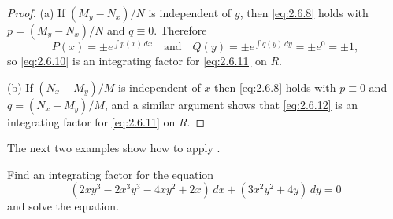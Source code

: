 \medskip

\begin{proof}
(a)
If $(M_y-N_x)/N$ is independent of $y$, then \eqref{eq:2.6.8}
 holds with $p=(M_y-N_x)/N$ and $q\equiv0$. Therefore
 \[
P(x)=\pm e^{\int p(x)\,dx}\quad\text{and}\quad Q(y)=\pm e^{\int
q(y)\,dy}=\pm e^0=\pm1,
 \]
so \eqref{eq:2.6.10} is an integrating factor for \eqref{eq:2.6.11} on $R$.

(b) If $(N_x-M_y)/M$ is independent of $x$ then \eqref{eq:2.6.8} holds
with $p\equiv0$ and $q=(N_x-M_y)/M$, and a similar argument shows that
\eqref{eq:2.6.12} is an integrating factor for \eqref{eq:2.6.11} on $R$.
\end{proof}

The next two examples show how to apply
.

\begin{example}\label{example:2.6.1}
Find an integrating factor for the equation
\begin{equation}\label{eq:2.6.13}
(2xy^3-2x^3y^3-4xy^2+2x)\,dx+(3x^2y^2+4y)\,dy=0
\end{equation}
and solve the equation.
\end{example}

